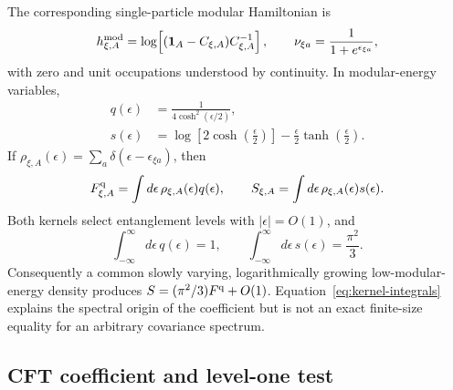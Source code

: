 \documentclass[aps,prx,twocolumn,floatfix,nofootinbib,superscriptaddress,longbibliography]{revtex4-2}
\begin{document}
The corresponding single-particle modular Hamiltonian is
\begin{equation}
 h_{\xi,A}^{\rm mod}
 =\log\!\left[(\mathbf{1}_A-C_{\xi,A})C_{\xi,A}^{-1}\right],
 \qquad
 \nu_{\xi a}=\frac{1}{1+e^{\epsilon_{\xi a}}},
 \label{eq:modular-correlation-map}
\end{equation}
with zero and unit occupations understood by continuity.  In modular-energy variables,
\begin{align}
 q(\epsilon)&=\frac{1}{4\cosh^2(\epsilon/2)},\\
 s(\epsilon)&=
 \log\!\left[2\cosh\!\left(\frac{\epsilon}{2}\right)\right]
 -\frac{\epsilon}{2}\tanh\!\left(\frac{\epsilon}{2}\right).
 \label{eq:modular-spectral-kernels}
\end{align}
If $\rho_{\xi,A}(\epsilon)=\sum_a\delta(\epsilon-\epsilon_{\xi a})$, then
\begin{equation}
 F_{\xi,A}^{\rm q}=\int d\epsilon\,\rho_{\xi,A}(\epsilon)q(\epsilon),
 \qquad
 S_{\xi,A}=\int d\epsilon\,\rho_{\xi,A}(\epsilon)s(\epsilon).
 \label{eq:modular-density-integrals}
\end{equation}
Both kernels select entanglement levels with $|\epsilon|=O(1)$, and
\begin{equation}
 \int_{-\infty}^{\infty}d\epsilon\,q(\epsilon)=1,
 \qquad
 \int_{-\infty}^{\infty}d\epsilon\,s(\epsilon)=\frac{\pi^2}{3}.
 \label{eq:kernel-integrals}
\end{equation}
Consequently a common slowly varying, logarithmically growing low-modular-energy density
produces $S=(\pi^2/3)F^{\rm q}+O(1)$.  Equation~\eqref{eq:kernel-integrals} explains the
spectral origin of the coefficient but is not an exact finite-size equality for an
arbitrary covariance spectrum.

\subsection{CFT coefficient and level-one test}
\end{document}
